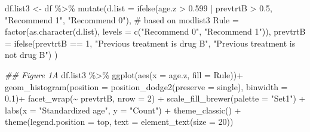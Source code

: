 \documentclass[
  letterpaper,
  DIV=11,
  numbers=noendperiod]{scrreprt}
\newenvironment{Shaded}{\begin{snugshade}}{\end{snugshade}}
\newcommand{\AttributeTok}[1]{\textcolor[rgb]{0.40,0.45,0.13}{#1}}
\newcommand{\CommentTok}[1]{\textcolor[rgb]{0.37,0.37,0.37}{#1}}
\newcommand{\DecValTok}[1]{\textcolor[rgb]{0.68,0.00,0.00}{#1}}
\newcommand{\DocumentationTok}[1]{\textcolor[rgb]{0.37,0.37,0.37}{\textit{#1}}}
\newcommand{\FloatTok}[1]{\textcolor[rgb]{0.68,0.00,0.00}{#1}}
\newcommand{\FunctionTok}[1]{\textcolor[rgb]{0.28,0.35,0.67}{#1}}
\newcommand{\NormalTok}[1]{\textcolor[rgb]{0.00,0.23,0.31}{#1}}
\newcommand{\OtherTok}[1]{\textcolor[rgb]{0.00,0.23,0.31}{#1}}
\newcommand{\SpecialCharTok}[1]{\textcolor[rgb]{0.37,0.37,0.37}{#1}}
\newcommand{\StringTok}[1]{\textcolor[rgb]{0.13,0.47,0.30}{#1}}
\begin{document}
\begin{Shaded}
\begin{Highlighting}[]
\NormalTok{df.list3 }\OtherTok{\textless{}{-}}\NormalTok{ df }\SpecialCharTok{\%\textgreater{}\%}
  \FunctionTok{mutate}\NormalTok{(}\AttributeTok{d.list =} \FunctionTok{ifelse}\NormalTok{(age.z }\SpecialCharTok{\textgreater{}} \FloatTok{0.599} \SpecialCharTok{|}\NormalTok{ prevtrtB }\SpecialCharTok{\textgreater{}} \FloatTok{0.5}\NormalTok{, }\StringTok{"Recommend 1"}\NormalTok{, }\StringTok{"Recommend 0"}\NormalTok{), }\CommentTok{\# based on modlist3}
         \AttributeTok{Rule =} \FunctionTok{factor}\NormalTok{(}\FunctionTok{as.character}\NormalTok{(d.list), }\AttributeTok{levels =} \FunctionTok{c}\NormalTok{(}\StringTok{"Recommend 0"}\NormalTok{, }\StringTok{"Recommend 1"}\NormalTok{)),}
         \AttributeTok{prevtrtB =} \FunctionTok{ifelse}\NormalTok{(prevtrtB }\SpecialCharTok{==} \DecValTok{1}\NormalTok{, }\StringTok{"Previous treatment is drug B"}\NormalTok{, }\StringTok{"Previous treatment is not drug B"}\NormalTok{)}
\NormalTok{  )}

\DocumentationTok{\#\# Figure 1A}
\NormalTok{df.list3 }\SpecialCharTok{\%\textgreater{}\%}
  \FunctionTok{ggplot}\NormalTok{(}\FunctionTok{aes}\NormalTok{(}\AttributeTok{x =}\NormalTok{ age.z, }\AttributeTok{fill =}\NormalTok{ Rule))}\SpecialCharTok{+}
  \FunctionTok{geom\_histogram}\NormalTok{(}\AttributeTok{position =} \FunctionTok{position\_dodge2}\NormalTok{(}\AttributeTok{preserve =} \StringTok{\textquotesingle{}single\textquotesingle{}}\NormalTok{), }\AttributeTok{binwidth =} \FloatTok{0.1}\NormalTok{)}\SpecialCharTok{+}
  \FunctionTok{facet\_wrap}\NormalTok{(}\SpecialCharTok{\textasciitilde{}}\NormalTok{ prevtrtB, }\AttributeTok{nrow =} \DecValTok{2}\NormalTok{) }\SpecialCharTok{+}
  \FunctionTok{scale\_fill\_brewer}\NormalTok{(}\AttributeTok{palette =} \StringTok{"Set1"}\NormalTok{) }\SpecialCharTok{+}
  \FunctionTok{labs}\NormalTok{(}\AttributeTok{x =} \StringTok{"Standardized age"}\NormalTok{, }\AttributeTok{y =} \StringTok{"Count"}\NormalTok{) }\SpecialCharTok{+}
  \FunctionTok{theme\_classic}\NormalTok{() }\SpecialCharTok{+}
  \FunctionTok{theme}\NormalTok{(}\AttributeTok{legend.position =} \StringTok{\textquotesingle{}top\textquotesingle{}}\NormalTok{, }\AttributeTok{text =} \FunctionTok{element\_text}\NormalTok{(}\AttributeTok{size =} \DecValTok{20}\NormalTok{))}
\end{Highlighting}
\end{Shaded}
\end{document}

